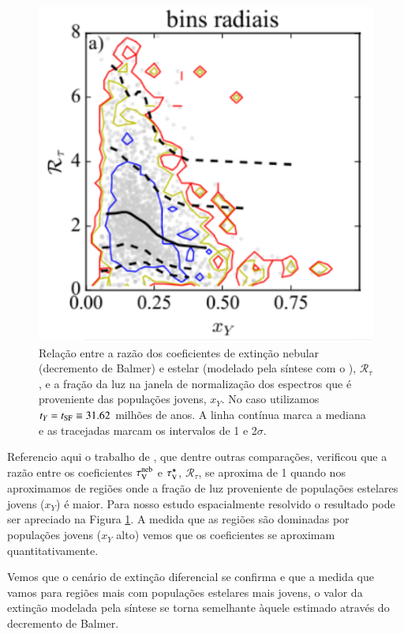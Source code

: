 \begin{figure}
	\centering
	\includegraphics{figuras/RtauVxY.pdf}
	\caption[$\mathcal{R}_\tau \times x_Y$]
	{Relação entre a razão dos coeficientes de extinção nebular (decremento de Balmer) e estelar (modelado pela síntese com o \starlight), $\mathcal{R}_\tau$, e a fração da luz na janela de normalização dos espectros que é proveniente das populações jovens, $x_Y$. No caso utilizamos $t_Y = t_{\rm SF} \equiv 31.62$ milhões de anos. A linha contínua marca a mediana e as tracejadas marcam os intervalos de 1 e 2$\sigma$. }
	\label{fig:RtauVxY}
\end{figure}

Referencio aqui o trabalho de \citet{Mari2016}, que dentre outras comparações, verificou que a razão entre os coeficientes $\tau_{\mathrm{V}}^{\mathrm{neb}}$ e $\tau_{\mathrm{V}}^\star$, $\mathcal{R}_\tau$, se aproxima de 1 quando nos aproximamos de regiões onde a fração de luz proveniente de populações estelares jovens ($x_Y$) é maior. Para nosso estudo espacialmente resolvido o resultado pode ser apreciado na Figura \ref{fig:RtauVxY}. A medida que as regiões são dominadas por populações jovens ($x_Y$ alto) vemos que os coeficientes se aproximam quantitativamente.

Vemos que o cenário de extinção diferencial se confirma e que a medida que vamos para regiões mais com populações estelares mais jovens, o valor da extinção modelada pela síntese se torna semelhante àquele estimado através do decremento de Balmer.

